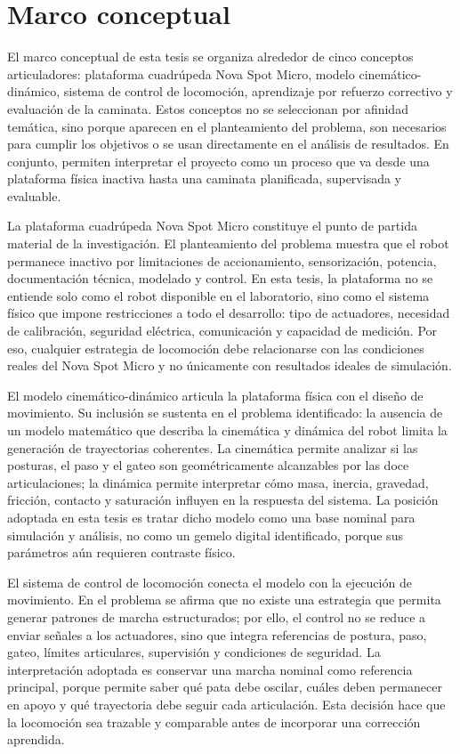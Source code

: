 \chapter{Marco conceptual}

El marco conceptual de esta tesis se organiza alrededor de cinco conceptos
articuladores: plataforma cuadrúpeda Nova Spot Micro, modelo
cinemático-dinámico, sistema de control de locomoción, aprendizaje por refuerzo
correctivo y evaluación de la caminata. Estos conceptos no se seleccionan por
afinidad temática, sino porque aparecen en el planteamiento del problema, son
necesarios para cumplir los objetivos o se usan directamente en el análisis de
resultados. En conjunto, permiten interpretar el proyecto como un proceso que va
desde una plataforma física inactiva hasta una caminata planificada,
supervisada y evaluable.

La plataforma cuadrúpeda Nova Spot Micro constituye el punto de partida material
de la investigación. El planteamiento del problema muestra que el robot
permanece inactivo por limitaciones de accionamiento, sensorización, potencia,
documentación técnica, modelado y control. En esta tesis, la plataforma no se
entiende solo como el robot disponible en el laboratorio, sino como el sistema
físico que impone restricciones a todo el desarrollo: tipo de actuadores,
necesidad de calibración, seguridad eléctrica, comunicación y capacidad de
medición. Por eso, cualquier estrategia de locomoción debe relacionarse con las
condiciones reales del Nova Spot Micro y no únicamente con resultados ideales de
simulación.

El modelo cinemático-dinámico articula la plataforma física con el diseño de
movimiento. Su inclusión se sustenta en el problema identificado: la ausencia de
un modelo matemático que describa la cinemática y dinámica del robot limita la
generación de trayectorias coherentes. La cinemática permite analizar si las
posturas, el paso y el gateo son geométricamente alcanzables por las doce
articulaciones; la dinámica permite interpretar cómo masa, inercia, gravedad,
fricción, contacto y saturación influyen en la respuesta del sistema. La
posición adoptada en esta tesis es tratar dicho modelo como una base nominal
para simulación y análisis, no como un gemelo digital identificado, porque sus
parámetros aún requieren contraste físico.

El sistema de control de locomoción conecta el modelo con la ejecución de
movimiento. En el problema se afirma que no existe una estrategia que permita
generar patrones de marcha estructurados; por ello, el control no se reduce a
enviar señales a los actuadores, sino que integra referencias de postura, paso,
gateo, límites articulares, supervisión y condiciones de seguridad. La
interpretación adoptada es conservar una marcha nominal como referencia
principal, porque permite saber qué pata debe oscilar, cuáles deben permanecer
en apoyo y qué trayectoria debe seguir cada articulación. Esta decisión hace que
la locomoción sea trazable y comparable antes de incorporar una corrección
aprendida.

